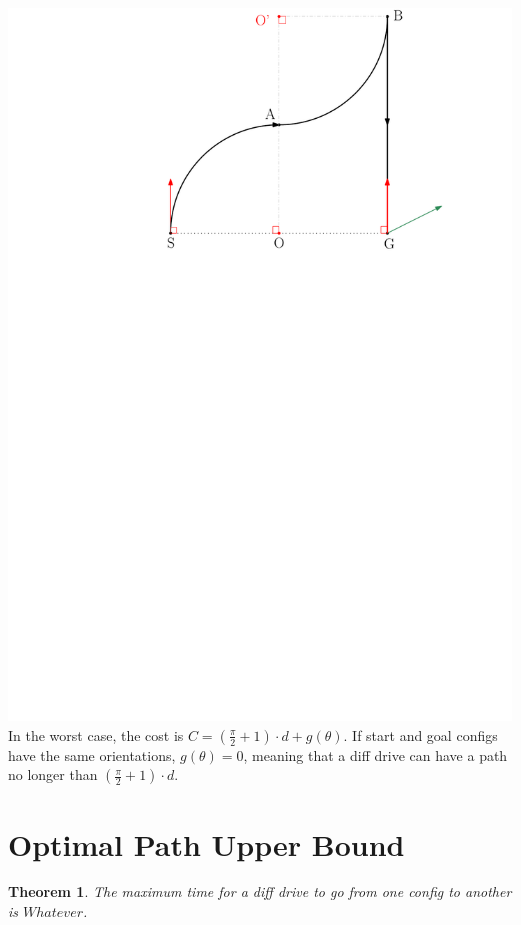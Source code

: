 \documentclass[12pt]{article}
\newtheorem{theorem}{Theorem}[section]
\begin{document}
  \includegraphics[scale=0.8]{Diff_Drive_Worst_Case}\\
  
  In the worst case, the cost is $C = (\frac{\pi}{2} + 1) \cdot d + g(\theta)$. If start and goal configs have the same orientations, $g(\theta) = 0$, meaning that a diff drive can have a path no longer than $(\frac{\pi}{2} + 1) \cdot d$.
  
  \section{Optimal Path Upper Bound}
  \begin{theorem}
  	The maximum time for a diff drive to go from one config to another is $Whatever$.
  \end{theorem}
  
\end{document}
